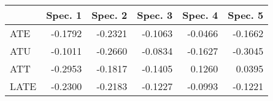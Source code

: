 
\begin{tabular}{lrrrrr}
\toprule
  & Spec. 1 & Spec. 2 & Spec. 3 & Spec. 4 & Spec. 5\\
\midrule
ATE & -0.1792 & -0.2321 & -0.1063 & -0.0466 & -0.1662\\
ATU & -0.1011 & -0.2660 & -0.0834 & -0.1627 & -0.3045\\
ATT & -0.2953 & -0.1817 & -0.1405 & 0.1260 & 0.0395\\
LATE & -0.2300 & -0.2183 & -0.1227 & -0.0993 & -0.1221\\
\bottomrule
\end{tabular}
